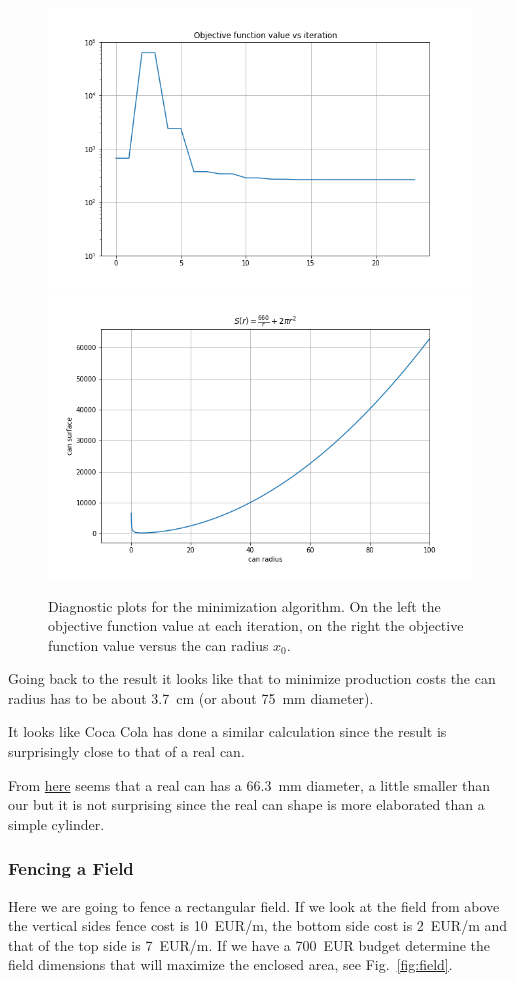\begin{figure}[htb]
	\centering
	\includegraphics[width=0.45\linewidth]{figures/objective_function_value}
	\includegraphics[width=0.45\linewidth]{figures/can_surface}
	\caption{Diagnostic plots for the minimization algorithm. On the left the objective function value at each iteration, on the right the objective function 
  value versus the can radius $x_0$.}
	\label{fig:minimization_diagnostic}
\end{figure}

Going back to the result it looks like that to minimize production costs the can radius has to be about 3.7~cm (or about 75~mm diameter).

\begin{curiosity}
It looks like Coca Cola has done a similar calculation since the result is surprisingly close to that of a real can. 

From \href{	https://www.ball.com/eu/solutions/markets-capabilities/capabilities/beverage-cans/standard-range
}{here} seems that a real can has a 66.3~mm diameter, a little smaller than our but it is not surprising since the real can shape is more elaborated than a 
simple cylinder.
\end{curiosity}

\subsubsection{Fencing a Field}
\label{example-with-constraint}

Here we are going to fence a rectangular field. If we look at the field from above the vertical sides fence cost is 10~EUR/m, the bottom side cost is 2~EUR/m 
and that of the top side is 7~EUR/m. If we have a 700~EUR budget determine the field dimensions that will maximize the enclosed area, see Fig.~\ref{fig:field}.

